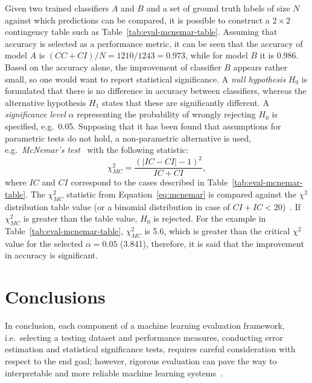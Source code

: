 Given two trained classifiers $A$ and $B$ and a set of ground truth labels of size $N$ against which predictions can be compared, it is possible to construct a $2\times 2$ contingency table such as Table~\ref{tab:eval-mcnemar-table}.
Assuming that accuracy is selected as a performance metric, it can be seen that the accuracy of model $A$ is $(CC + CI) / N = 1210 / 1243 = 0.973$, while for model $B$ it is $0.986$.
Based on the accuracy alone, the improvement of classifier $B$ appears rather small, so one would want to report statistical significance.
A \emph{null hypothesis} $H_0$ is formulated that there is no difference in accuracy between classifiers, whereas the alternative hypothesis $H_1$ states that these are significantly different.
A \emph{significance level} $\alpha$ representing the probability of wrongly rejecting $H_0$ is specified, e.g.\ 0.05.
Supposing that it has been found that assumptions for parametric tests do not hold, a non-parametric alternative is used, e.g.\ \emph{McNemar's test}~\citep{Mcnemar1947} with the following statistic:
\begin{equation}
    \label{eq:mcnemar}
    \chi^2_{MC} = \frac{(\lvert IC - CI  \rvert - 1)^2}{IC + CI},
\end{equation}
where $IC$ and $CI$ correspond to the cases described in Table~\ref{tab:eval-mcnemar-table}.
%
The $\chi^2_{MC}$ statistic from Equation~\ref{eq:mcnemar} is compared against the $\chi^2$ distribution table value (or a binomial distribution in case of $CI + IC < 20$)~\citep{Japkowic2011}.
If $\chi^2_{MC}$ is greater than the table value, $H_0$ is rejected.
%
For the example in Table~\ref{tab:eval-mcnemar-table}, $\chi^2_{MC}$ is 5.6, which is greater than the critical $\chi^2$ value for the selected $\alpha=0.05$ (3.841), therefore, it is said that the improvement in accuracy is significant.

\section{Conclusions}
In conclusion, each component of a machine learning evaluation framework, i.e.\ selecting a testing dataset and performance measures, conducting error estimation and statistical significance tests,
requires careful consideration with respect to the end goal; however, rigorous evaluation can pave the way to interpretable and more reliable machine learning systems~\citep{Doshi2017}.

